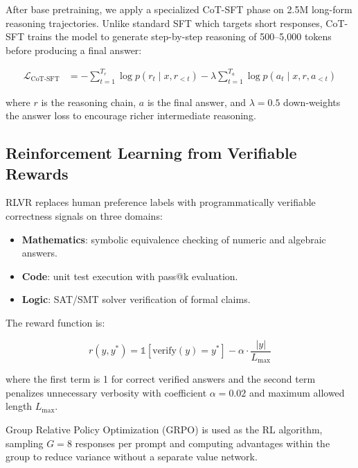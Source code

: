 \documentclass[11pt,a4paper]{article}
\begin{document}
After base pretraining, we apply a specialized CoT-SFT phase on 2.5M long-form reasoning
trajectories. Unlike standard SFT which targets short responses, CoT-SFT trains the model to
generate step-by-step reasoning of 500--5{,}000 tokens before producing a final answer:

\begin{align}
  \mathcal{L}_{\text{CoT-SFT}} &= -\sum_{t=1}^{T_r} \log p(r_t \mid x, r_{<t})
                                   - \lambda \sum_{t=1}^{T_a} \log p(a_t \mid x, r, a_{<t})
\end{align}

where $r$ is the reasoning chain, $a$ is the final answer, and $\lambda = 0.5$ down-weights
the answer loss to encourage richer intermediate reasoning.

\subsection{Reinforcement Learning from Verifiable Rewards}

RLVR \cite{lightman2023lets, cobbe2021gsm8k} replaces human preference labels with
programmatically verifiable correctness signals on three domains:

\begin{itemize}
  \item \textbf{Mathematics}: symbolic equivalence checking of numeric and algebraic answers.
  \item \textbf{Code}: unit test execution with pass@k evaluation.
  \item \textbf{Logic}: SAT/SMT solver verification of formal claims.
\end{itemize}

The reward function is:

\begin{equation}
  r(y, y^*) = \mathbb{1}[\text{verify}(y) = y^*] - \alpha \cdot \frac{|y|}{L_{\max}}
\end{equation}

where the first term is 1 for correct verified answers and the second term penalizes unnecessary
verbosity with coefficient $\alpha = 0.02$ and maximum allowed length $L_{\max}$.

Group Relative Policy Optimization (GRPO) \cite{shao2024deepseekmath} is used as the RL
algorithm, sampling $G=8$ responses per prompt and computing advantages within the group to
reduce variance without a separate value network.

\end{document}
